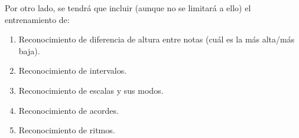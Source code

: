 \par Por otro lado, se tendrá que incluir (aunque no se limitará a ello) el entrenamiento de:
\begin{enumerate}
	\item Reconocimiento de diferencia de altura entre notas (cuál es la más alta/más baja).
	\item Reconocimiento de intervalos.
	\item Reconocimiento de escalas y sus modos.
	\item Reconocimiento de acordes.
	\item Reconocimiento de ritmos.
\end{enumerate}
%
%
%
%
